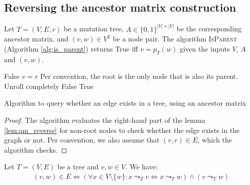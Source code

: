 \subsection{Reversing the ancestor matrix construction}

\begin{theorem}
    \label{theo:am_reverse}
    Let $T=(V, E, r)$ be a mutation tree, $A \in \{0, 1\}^{|V| \times |V|}$ be the corresponding ancestor matrix, and $(v, w) \in V^2$ be a node pair. The algorithm \textsc{IsParent} (Algorithm \ref{alg:is_parent}) returns True iff $v = p_T(w)$ given the inputs $V$, $A$ and $(v,w)$.
\end{theorem}

\begin{algorithm}
    \begin{algorithmic}[1]
                \State \Return False
            \EndIf
                \State \Return $v = r$ \Comment Per convention, the root is the only node that is also its parent.
            \EndIf
             \Comment Unroll completely
                    \State \Return False
                \EndIf
            \EndFor
            \State \Return True
        \EndFunction
    \end{algorithmic}
    \caption{Algorithm to query whether an edge exists in a tree, using an ancestor matrix}
    \label{alg:is_parent}
\end{algorithm}

\begin{proof}
    The algorithm evaluates the right-hand part of the lemma \ref{lem:am_reverse} for non-root nodes to check whether the edge exists in the graph or not. Per convention, we also assume that $(r,r) \in E$, which the algorithm checks.
\end{proof}

\begin{lemma}
    \label{lem:am_reverse}
    Let $T = (V, E)$ be a tree and $v, w \in V$. We have:
    \begin{align*}
        (v, w) \in E \Leftrightarrow (\forall x \in V \setminus \{w\}: x \leadsto_T v \Leftrightarrow x \leadsto_T w) \wedge (v \leadsto_T w)
    \end{align*}
\end{lemma}

